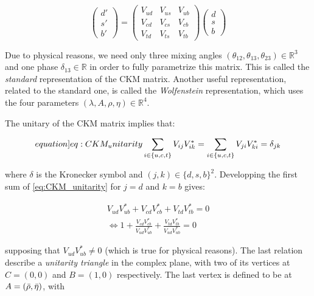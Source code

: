 \begin{equation}
    \begin{pmatrix}
        d' \\
        s' \\
        b'
    \end{pmatrix}
    =
    \begin{pmatrix}
        V_{ud} & V_{us} & V_{ub} \\
        V_{cd} & V_{cs} & V_{cb} \\
        V_{td} & V_{ts} & V_{tb}
    \end{pmatrix}
    \begin{pmatrix}
        d \\
        s \\
        b
    \end{pmatrix}
\end{equation}

Due to physical reasons, we need only three mixing angles $\left(\theta_{12}, \theta_{13}, \theta_{23}\right) \in \mathbb{R}^3$ and one phase $\delta_{13} \in \mathbb{R}$ in order to fully parametrize this matrix.
This is called the \textit{standard} representation of the \gls{CKM} matrix.
Another useful representation, related to the standard one, is called the \textit{Wolfenstein} representation, which uses the four parameters $\left(\lambda, A, \rho, \eta\right) \in \mathbb{R}^4$.

The unitary of the \gls{CKM} matrix implies that:

\begin{equation}\label[equation]{eq:CKM_unitarity}
    \sum_{i \in \{u, c, t\}} V_{ij}V_{ik}^* = \sum_{i \in \{u, c, t\}} V_{ji}V_{ki}^* = \delta_{jk}
\end{equation}

where $\delta$ is the Kronecker symbol and $\left(j, k\right) \in \{d, s, b\}^2$.
Developping the first sum of \cref{eq:CKM_unitarity} for $j = d$ and $k = b$ gives:

\begin{align}
    V_{ud}V_{ub}^* + V_{cd}V_{cb}^* + V_{td}V_{tb}^* = 0 \\
    \Longleftrightarrow 1 + \frac{V_{cd}V_{cb}^*}{V_{ud}V_{ub}^*} + \frac{V_{td}V_{tb}^*}{V_{ud}V_{ub}^*} = 0
\end{align}

supposing that $V_{ud}V_{ub}^* \neq 0$ (which is true for physical reasons).
The last relation describe a \textit{unitarity triangle} in the complex plane, with two of its vertices at $C = (0, 0)$ and $B = (1, 0)$ respectively.
The last vertex is defined to be at $A = (\Bar{\rho}, \Bar{\eta})$, with

